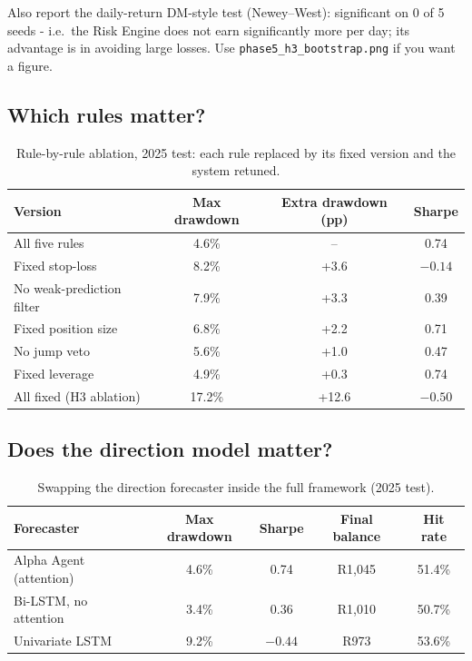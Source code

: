 \begin{guide}
Also report the daily-return DM-style test (Newey--West): significant on 0 of 5 seeds - i.e.\ the Risk Engine does not earn significantly more per day; its advantage is in avoiding large losses. Use \texttt{phase5\_h3\_bootstrap.png} if you want a figure.
\end{guide}
\tbc{}

\subsection{Which rules matter?}
\begin{table}[ht]
  \centering
  \caption{Rule-by-rule ablation, 2025 test: each rule replaced by its fixed version and the system retuned.}
  \label{tab:rule-ablation}
  \begin{tabular}{lccc}
    \toprule
    Version & Max drawdown & Extra drawdown (pp) & Sharpe \\
    \midrule
    All five rules             & 4.6\%  & --    & 0.74 \\
    Fixed stop-loss            & 8.2\%  & +3.6  & $-0.14$ \\
    No weak-prediction filter  & 7.9\%  & +3.3  & 0.39 \\
    Fixed position size        & 6.8\%  & +2.2  & 0.71 \\
    No jump veto               & 5.6\%  & +1.0  & 0.47 \\
    Fixed leverage             & 4.9\%  & +0.3  & 0.74 \\
    All fixed (H3 ablation)    & 17.2\% & +12.6 & $-0.50$ \\
    \bottomrule
  \end{tabular}
\end{table}

\subsection{Does the direction model matter?}
\begin{table}[ht]
  \centering
  \caption{Swapping the direction forecaster inside the full framework (2025 test).}
  \label{tab:model-ablation}
  \begin{tabular}{lcccc}
    \toprule
    Forecaster & Max drawdown & Sharpe & Final balance & Hit rate \\
    \midrule
    Alpha Agent (attention) & 4.6\% & 0.74 & R1{,}045 & 51.4\% \\
    Bi-LSTM, no attention   & 3.4\% & 0.36 & R1{,}010 & 50.7\% \\
    Univariate LSTM         & 9.2\% & $-0.44$ & R973 & 53.6\% \\
    \bottomrule
  \end{tabular}
\end{table}

